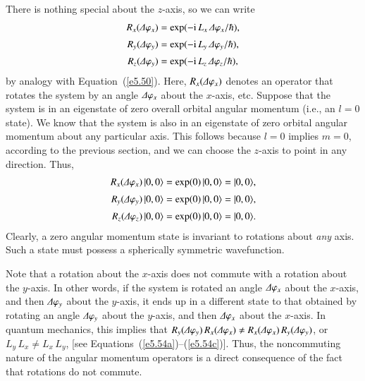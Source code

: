 There is nothing special about the $z$-axis, so we can write
\begin{align}\label{e5.54a}
R_x({\mit\Delta}\varphi_x) &= \exp(-{\rm i}\,L_x \,{\mit\Delta}\varphi_x/\hbar),\\[0.5ex]
R_y({\mit\Delta}\varphi_y) &= \exp(-{\rm i}\,L_y \,{\mit\Delta}\varphi_y/\hbar),\\[0.5ex]\label{e5.54c}
R_z({\mit\Delta}\varphi_y) &= \exp(-{\rm i}\,L_z\, {\mit\Delta}\varphi_z/\hbar),
\end{align}
by analogy with Equation~(\ref{e5.50}). Here, $R_x({\mit\Delta}\varphi_x)$ denotes an operator
that rotates the system by an angle ${\mit\Delta}\varphi_x$ about the $x$-axis, {\rm etc}.
Suppose that the system is in an eigenstate of zero overall orbital angular momentum
({\rm i.e.}, an $l=0$ state).
We know that the system is also in an eigenstate of zero orbital angular momentum 
about any particular axis. This follows because $l=0$ implies $m=0$, according
to  the
previous section, and we can choose the $z$-axis to point in any direction. 
Thus,
\begin{align}
R_x({\mit\Delta} \varphi_x)\, |0,0\rangle &=\exp(0)\,|0,0\rangle = |0,0\rangle,\\[0.5ex]
R_y({\mit\Delta} \varphi_y)\, |0,0\rangle &=\exp(0)\,|0,0\rangle = |0,0\rangle,\\[0.5ex]
R_z({\mit\Delta} \varphi_z) \,|0,0\rangle &=\exp(0)\,|0,0\rangle = |0,0\rangle.
\end{align}
Clearly, a zero angular momentum state is invariant to rotations about {\em any}\/
axis.
Such a state  must possess a spherically symmetric wavefunction. 

Note that a rotation about the $x$-axis does not commute with a rotation
about the $y$-axis. In other words, if the system is rotated an angle
${\mit\Delta}\varphi_x$ about the $x$-axis, and then ${\mit\Delta}\varphi_y$ about the
$y$-axis, it ends up in a different state to that obtained by rotating
an angle ${\mit\Delta}\varphi_y$ about the
$y$-axis, and then ${\mit\Delta}\varphi_x$ about the $x$-axis. In quantum
mechanics, this implies that $R_y({\mit\Delta}\varphi_y)\,R_x({\mit\Delta}\varphi_x)
\neq R_x({\mit\Delta}\varphi_x)\,R_y({\mit\Delta}\varphi_y)$, or 
$L_y \,L_x \neq L_x\, L_y$, [see  Equations~(\ref{e5.54a})--(\ref{e5.54c})]. Thus, the noncommuting
nature of the angular momentum operators is a direct consequence
of  the fact that
rotations do not commute. 

